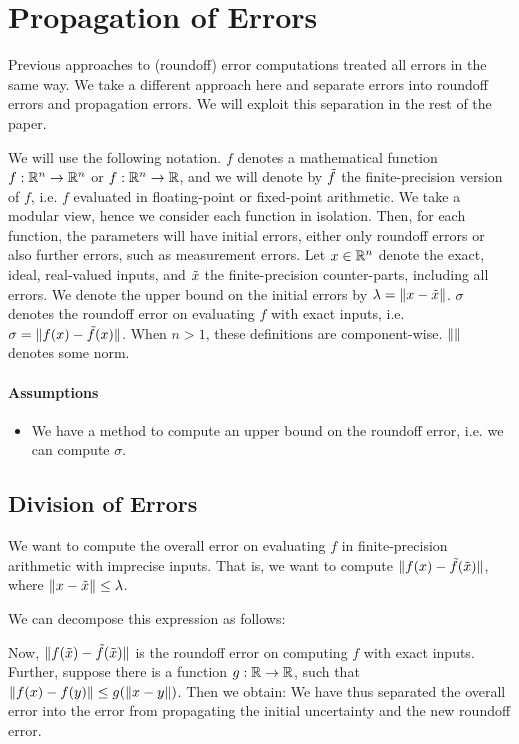 \section{Propagation of Errors}

Previous approaches to (roundoff) error computations treated all errors
in the same way. We take a different approach here and separate errors
into roundoff errors and propagation errors. We will exploit this separation
in the rest of the paper.

We will use the following notation.
$f$ denotes a mathematical function $f: \mathbb{R}^n \to \mathbb{R}^n$ or $f: \mathbb{R}^n \to \mathbb{R}$,
and we will denote by $\tilde{f}$ the finite-precision version of $f$, i.e. $f$ evaluated in floating-point
or fixed-point arithmetic.
We take a modular view, hence we consider each function in isolation. Then, for each function,
the parameters will have initial errors, either only roundoff errors or also further errors, such as measurement
errors. Let $x \in \mathbb{R}^n$ denote the exact, ideal, real-valued inputs, and $\tilde{x}$
the finite-precision counter-parts, including all errors. We denote the upper bound on the initial errors
by $\lambda = \lVert x - \tilde{x} \rVert$.
$\sigma$ denotes the roundoff error on evaluating $f$ with exact inputs, i.e.
  $\sigma = \lVert f(x) - \tilde{f}(x) \rVert$. When $n > 1$, these definitions are component-wise.
$\lVert \rVert$ denotes some norm.

\paragraph{Assumptions}
\begin{itemize}
\item We have a method to compute an upper bound on the roundoff error, i.e. we can compute $\sigma$.
\end{itemize}

\subsection{Division of Errors}
We want to compute the overall error on evaluating $f$ in finite-precision arithmetic with imprecise inputs.
That is, we want to compute
  $\lVert f(x) - \tilde{f}(\tilde{x}) \rVert$, where $\lVert x - \tilde{x} \rVert \le \lambda$.

We can decompose this expression as follows:

Now, $\lVert f(\tilde{x}) - \tilde{f}(\tilde{x}) \rVert$ is the roundoff error on
computing $f$ with exact inputs.
Further, suppose there is a function $g: \mathbb{R} \to \mathbb{R}$, such that $\lVert f(x) - f(y) \rVert \le g(\lVert x - y \rVert)$.
Then we obtain:
We have thus separated the overall error into the error from propagating
the initial uncertainty and the new roundoff error.
